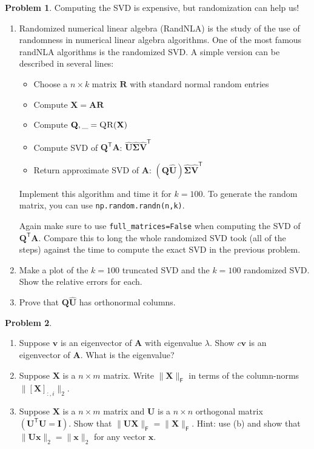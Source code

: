 \documentclass[12pt]{article}
\theoremstyle{definition}
\newtheorem{problem}{Problem}
\renewcommand{\vec}{\mathbf}
\newcommand{\T}{\mathsf{T}}
\newcommand{\F}{\mathsf{F}}
\begin{document}
\begin{problem}
    Computing the SVD is expensive, but randomization can help us!
    \begin{enumerate}
        \item Randomized numerical linear algebra (RandNLA) is the study of the use of randomness in numerical linear algebra algorithms. 
            One of the most famous randNLA algorithms is the randomized SVD.
            A simple version can be described in several lines:
            \begin{itemize}
                \item Choose a $n\times k$ matrix $\vec{R}$ with standard normal random entries
                \item Compute $\vec{X} = \vec{A} \vec{R}$
                \item Compute $\vec{Q},\_ = \textsc{QR}(\vec{X})$
                \item Compute SVD of $\vec{Q}^\T \vec{A}$: $\hat{\vec{U}} \hat{\vec{\Sigma}} \hat{\vec{V}}^\T$
                \item Return approximate SVD of $\vec{A}$: $(\vec{Q} \hat{\vec{U}}) \hat{\vec{\Sigma}} \hat{\vec{V}}^\T$  
            \end{itemize}

            Implement this algorithm and time it for $k=100$. 
            To generate the random matrix, you can use \lstinline{np.random.randn(n,k)}.


            Again make sure to use \lstinline{full_matrices=False} when computing the SVD of $\vec{Q}^\T \vec{A}$.
            Compare this to long the whole randomized SVD took (all of the steps) against the time to compute the exact SVD in the previous problem.
        
        \item 
            Make a plot of the $k=100$ truncated SVD and the $k=100$ randomized SVD.
            Show the relative errors for each. 

        \item Prove that $\vec{Q}\hat{\vec{U}}$ has orthonormal columns.
    \end{enumerate}
\end{problem}

\begin{problem}
    \begin{enumerate}
        \item Suppose $\vec{v}$ is an eigenvector of $\vec{A}$ with eigenvalue $\lambda$. Show $c\vec{v}$ is an eigenvector of $\vec{A}$. What is the eigenvalue?
        \item Suppose $\vec{X}$ is a $n\times m$ matrix. 
            Write $\|\vec{X}\|_\F$ in terms of the column-norms $\|[\vec{X}]_{:,i}\|_2$.
        \item Suppose $\vec{X}$ is a $n\times m$ matrix and $\vec{U}$ is a $n\times n$ orthogonal matrix $(\vec{U}^\T \vec{U} = \vec{I})$.
            Show that $\|\vec{U} \vec{X}\|_\F = \| \vec{X} \|_\F$. 
            Hint: use (b) and show that $\|\vec{U} \vec{x}\|_2 = \|\vec{x}\|_2$ for any vector $\vec{x}$.


    \end{enumerate}
\end{problem}
\end{document}
